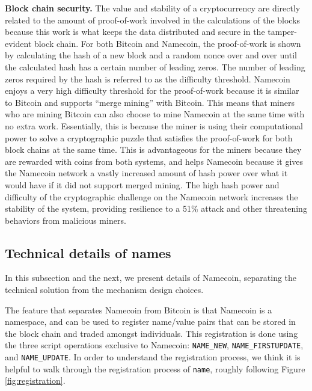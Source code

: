 {\bf Block chain security.}
The value and stability of a cryptocurrency are directly related to the amount of proof-of-work involved in the calculations of the blocks because this work is what keeps the data distributed and secure in the tamper-evident block chain. For both Bitcoin and Namecoin, the proof-of-work is shown by calculating the hash of a new block and a random nonce over and over until the calculated hash has a certain number of leading zeros. The number of leading zeros required by the hash is referred to as the difficulty threshold. Namecoin enjoys a very high difficulty threshold for the proof-of-work because it is similar to Bitcoin and supports ``merge mining'' with Bitcoin. This means that miners who are mining Bitcoin can also choose to mine Namecoin at the same time with no extra work. Essentially, this is because the miner is using their computational power to solve a cryptographic puzzle that satisfies the proof-of-work for both block chains at the same time. This is advantageous for the miners because they are rewarded with coins from both systems, and helps Namecoin because it gives the Namecoin network a vastly increased amount of hash power over what it would have if it did not support merged mining. The high hash power and difficulty of the cryptographic challenge on the Namecoin network increases the stability of the system, providing resilience to a 51\% attack and other threatening behaviors from malicious miners.

\subsection{Technical details of names}

In this subsection and the next, we present details of Namecoin, separating the technical solution from the mechanism design choices. 

The feature that separates Namecoin from Bitcoin is that Namecoin is a namespace, and can be used to register name/value pairs that can be stored in the block chain and traded amongst individuals. This registration is done using the three script operations exclusive to Namecoin: {\tt NAME\_NEW}, {\tt NAME\_FIRSTUPDATE}, and {\tt NAME\_UPDATE}. In order to understand the registration process, we think it is helpful to walk through the registration process of {\tt name}, roughly following Figure \ref{fig:registration}. 


